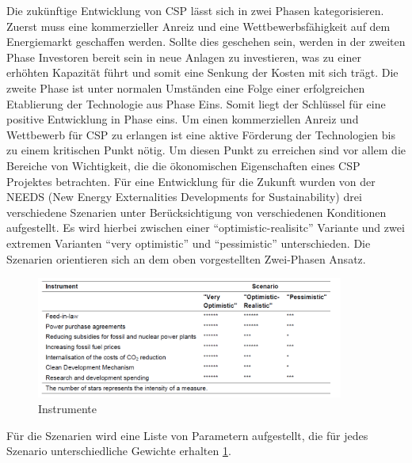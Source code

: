 Die zukünftige Entwicklung von CSP lässt sich in zwei Phasen kategorisieren. Zuerst muss eine kommerzieller Anreiz und eine Wettbewerbsfähigkeit auf dem Energiemarkt geschaffen werden. Sollte dies geschehen sein, werden in der zweiten Phase Investoren bereit sein in neue Anlagen zu investieren, was zu einer erhöhten Kapazität führt und somit eine Senkung der Kosten mit sich trägt. Die zweite Phase ist unter normalen Umständen eine Folge einer erfolgreichen Etablierung der Technologie aus Phase Eins. Somit liegt der Schlüssel für eine positive Entwicklung in Phase eins. Um einen kommerziellen Anreiz und Wettbewerb für CSP zu erlangen ist eine aktive Förderung der Technologien bis zu einem kritischen Punkt nötig. Um diesen Punkt zu erreichen sind vor allem die Bereiche von Wichtigkeit, die die ökonomischen Eigenschaften eines CSP Projektes betrachten.
Für eine Entwicklung für die Zukunft wurden von der NEEDS (New Energy Externalities Developments for Sustainability) drei verschiedene Szenarien unter Berücksichtigung von verschiedenen Konditionen aufgestellt. Es wird hierbei zwischen einer "`optimistic-realisitc"' Variante und zwei extremen Varianten "`very optimistic"' und "`pessimistic"' unterschieden. Die Szenarien orientieren sich an dem oben vorgestellten Zwei-Phasen Ansatz.

\begin{figure}[H]
	\centering
	\includegraphics[width=0.9\textwidth,trim=1 1 1 1,clip]{instruments_scenario.png}
	\caption{Instrumente}
	\label{fig:inst}
\end{figure}

Für die Szenarien wird eine Liste von Parametern aufgestellt, die für jedes Szenario unterschiedliche Gewichte erhalten \ref{fig:inst}.

